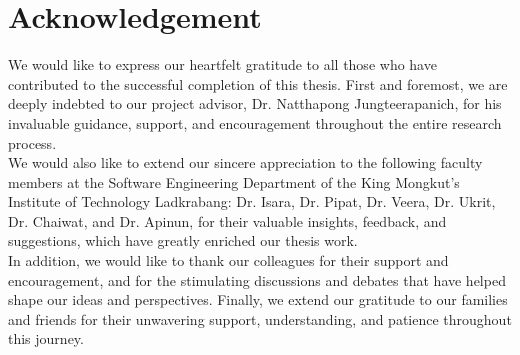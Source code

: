 \section*{Acknowledgement}
\noindent We would like to express our heartfelt gratitude to all those who have contributed to the successful completion of this thesis. First and foremost, we are deeply indebted to our project advisor, Dr. Natthapong Jungteerapanich, for his invaluable guidance, support, and encouragement throughout the entire research process. \\

\noindent We would also like to extend our sincere appreciation to the following faculty members at the Software Engineering Department of the King Mongkut's Institute of Technology Ladkrabang: Dr. Isara, Dr. Pipat, Dr. Veera, Dr. Ukrit, Dr. Chaiwat, and Dr. Apinun, for their valuable insights, feedback, and suggestions, which have greatly enriched our thesis work.\\

\noindent In addition, we would like to thank our colleagues for their support and encouragement, and for the stimulating discussions and debates that have helped shape our ideas and perspectives. Finally, we extend our gratitude to our families and friends for their unwavering support, understanding, and patience throughout this journey.

\restoregeometry